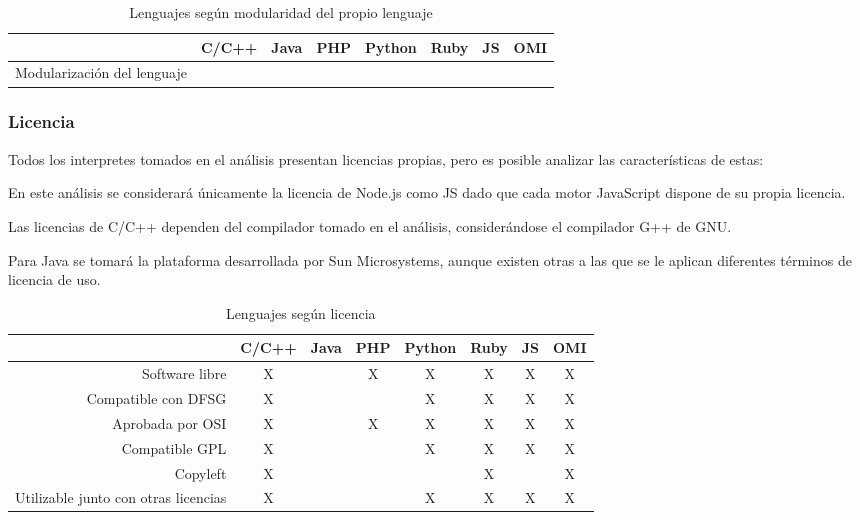 \FloatBarrier
\begin{table}[h]
\begin{center}
\begin{tabular}{|r|c|c|c|c|c|c|c|} \hline
 & C/C++ & Java & PHP  & Python & Ruby & JS & OMI\\ \hline
Modularización del lenguaje & & &  &  &  &   &  \\ \hline
\end{tabular}
\caption{Lenguajes según modularidad del propio lenguaje}
\end{center}
\end{table}
\FloatBarrier


\subsubsection{Licencia}
Todos los interpretes tomados en el análisis presentan licencias propias, pero es
posible analizar las características de estas:

En este análisis se considerará únicamente la licencia de Node.js como JS
dado que cada motor JavaScript dispone de su propia licencia. 

Las licencias de C/C++ dependen del compilador tomado en el análisis, considerándose el 
compilador G++ de GNU.

Para Java se tomará la plataforma desarrollada por Sun Microsystems, aunque   
existen otras a las que se le aplican diferentes términos de licencia de uso.

\FloatBarrier
\begin{table}[h]
\begin{center}
\begin{tabular}{|r|c|c|c|c|c|c|c|} \hline
 & C/C++ & Java & PHP  & Python & Ruby & JS & OMI\\ \hline
Software libre & X &  & X & X & X & X  &  X \\ \hline
Compatible con DFSG & X & &  & X & X & X  &  X\\ \hline
Aprobada por OSI & X & & X & X & X &  X &  X\\ \hline
Compatible GPL & X & &  & X & X  & X  &  X \\ \hline
Copyleft & X & &  & & X &   &  X\\ \hline
Utilizable junto con otras licencias & X & &  & X & X &  X &  X\\ \hline
\end{tabular}
\caption{Lenguajes según licencia}
\end{center}
\end{table}
\FloatBarrier

